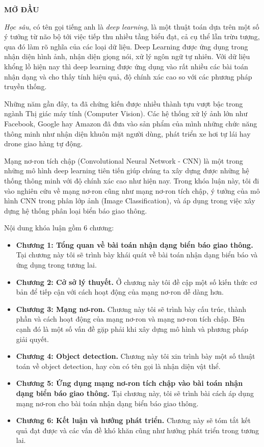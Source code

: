 \newpage
\begin{center}
 \textbf{MỞ ĐẦU}
\end{center}
\par
\textit{Học sâu}, có tên gọi tiếng anh là \textit{deep learning}, là một thuật toán dựa trên một số ý tưởng từ não bộ tới việc tiếp thu nhiều tầng biểu đạt, cả cụ thể lẫn trừu tượng, qua đó làm rõ nghĩa của các loại dữ liệu. Deep Learning được ứng dụng trong nhận diện hình ảnh, nhận diện giọng nói, xử lý ngôn ngữ tự nhiên. Với dữ liệu khổng lồ hiện nay thì deep learning được ứng dụng vào rất nhiều các bài toán nhận dạng và cho thấy tính hiệu quả, độ chính xác cao so với các phương pháp truyền thống. \par
Những năm gần đây, ta đã chứng kiến được nhiều thành tựu vượt bậc trong ngành Thị giác máy tính (Computer Vision). Các hệ thống xử lý ảnh lớn như Facebook, Google hay Amazon đã đưa vào sản phẩm của mình những chức năng thông minh như nhận diện khuôn mặt người dùng, phát triển xe hơi tự lái hay drone giao hàng tự động. \par
Mạng nơ-ron tích chập (Convolutional Neural Network - CNN) là một trong những mô hình deep learning tiên tiến giúp chúng ta xây dựng được những hệ thống thông minh với độ chính xác cao như hiện nay. Trong khóa luận này, tôi đi vào nghiên cứu về mạng nơ-ron cũng như mạng nơ-ron tích chập, ý tưởng của mô hình CNN trong phân lớp ảnh (Image Classification), và áp dụng trong việc xây dựng hệ thống phân loại biển báo giao thông.\par
Nội dung khóa luận gồm 6 chương:
\begin{itemize}
\item[] \textbf{Chương 1: Tổng quan về bài toán nhận dạng biển báo giao thông.} Tại chương này tôi sẽ trình bày khái quát về bài toán nhận dạng biển báo và ứng dụng trong tương lai.
\item[] \textbf{Chương 2: Cở sở lý thuyết.} Ở chương này tôi đề cập một số kiến thức cơ bản để tiếp cận với cách hoạt động của mạng nơ-ron dễ dàng hơn.
\item[] \textbf{Chương 3: Mạng nơ-ron.} Chương này tôi sẽ trình bày cấu trúc, thành phần và cách hoạt động của mạng nơ-ron và mạng nơ-ron tích chập. Bên cạnh đó là một số vấn đề gặp phải khi xây dựng mô hình và phương pháp giải quyết.
\item[] \textbf{Chương 4: Object detection.} Chương này tôi xin trình bày một số thuật toán về object detection, hay còn có tên gọi là nhận diện vật thể.
\item[] \textbf{Chương 5: Ứng dụng mạng nơ-ron tích chập vào bài toán nhận dạng biển báo giao thông.} Tại chương này, tôi sẽ trình bài cách áp dụng mạng nơ-ron cho bài toán nhận dạng biển báo giao thông.
\item[] \textbf{Chương 6: Kết luận và hướng phát triển.} Chương này sẽ tóm tắt kết quả đạt được và các vấn đề khó khăn cũng như hướng phát triển trong tương lai.
\end{itemize}
